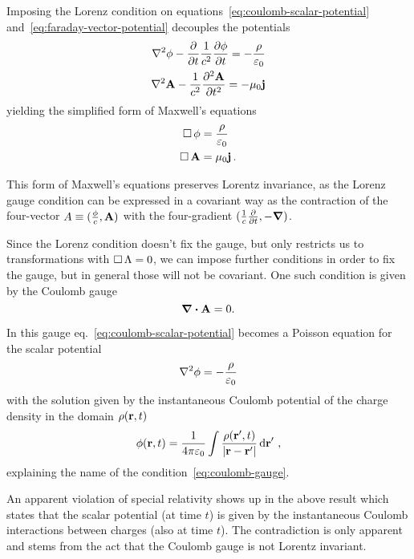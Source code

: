 \documentclass[12pt, class=report, crop=false]{standalone}
\begin{document}
Imposing the Lorenz condition on equations~\eqref{eq:coulomb-scalar-potential}
and~\eqref{eq:faraday-vector-potential} decouples the potentials
\begin{align*}
  \laplacian{\phi} - \pdv{t} \frac{1}{c^2} \pdv{\phi}{t} = -\frac{\rho}{\varepsilon_0} \\
  \laplacian{\vb{A}} - \frac{1}{c^2}\pdv[2]{\vb{A}}{t} = -\mu_0 \vb{j}
\end{align*}
yielding the simplified form of Maxwell's equations
\begin{align*}
  \operatorname{\Box} \phi &= \frac{\rho}{\varepsilon_0} \\
  \operatorname{\Box} \vb{A} &= \mu_0 \vb{j}\,.
\end{align*}

This form of Maxwell's equations preserves Lorentz invariance, as the Lorenz
gauge condition can be expressed in a covariant way as the contraction of the
four-vector \(A \equiv (\frac{\phi}{c}, \vb{A})\) with the four-gradient
\((\frac{1}{c}\pdv{t}, -\grad)\).

Since the Lorenz condition doesn't fix the gauge, but only restricts us to
transformations with \(\operatorname{\Box} \Lambda = 0\), we can impose further conditions
in order to fix the gauge, but in general those will not be covariant.
One such condition is given by the Coulomb gauge
\begin{equation}
  \label{eq:coulomb-gauge}
  \div{\vb{A}} = 0.
\end{equation}

In this gauge eq.~\eqref{eq:coulomb-scalar-potential} becomes a Poisson equation
for the scalar potential
\begin{equation}
  \label{eq:coulomb-poisson}
  \laplacian{\phi} = -\frac{\rho}{\varepsilon_0}
\end{equation}
with the solution given by the instantaneous Coulomb potential of the charge
density in the domain \(\rho(\vb{r},t)\)
\begin{equation}
  \label{eq:scalar-potential-solution}
  \phi(\vb{r},t) = \frac{1}{4\pi \varepsilon_0} \int \frac{\rho(\vb{r}',t)}{|\vb{r}-\vb{r}'|} \dd{\vb{r}}'\,,
\end{equation}
explaining the name of the condition~\eqref{eq:coulomb-gauge}.

An apparent violation of special relativity shows up in the above result which
states that the scalar potential (at time \(t\)) is given by the instantaneous Coulomb
interactions between charges (also at time \(t\)). The contradiction is only
apparent and stems from the act that the Coulomb gauge is not Lorentz invariant.
\end{document}
